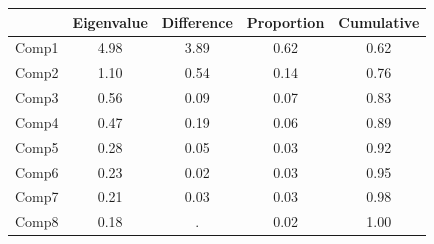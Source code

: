 {
\def\sym#1{\ifmmode^{#1}\else\(^{#1}\)\fi}
\begin{tabular}{l*{1}{cccc}}
\toprule
            &  Eigenvalue&  Difference&  Proportion&  Cumulative\\
\midrule
Comp1       &        4.98&        3.89&        0.62&        0.62\\
Comp2       &        1.10&        0.54&        0.14&        0.76\\
Comp3       &        0.56&        0.09&        0.07&        0.83\\
Comp4       &        0.47&        0.19&        0.06&        0.89\\
Comp5       &        0.28&        0.05&        0.03&        0.92\\
Comp6       &        0.23&        0.02&        0.03&        0.95\\
Comp7       &        0.21&        0.03&        0.03&        0.98\\
Comp8       &        0.18&           .&        0.02&        1.00\\
\bottomrule
\end{tabular}
}
